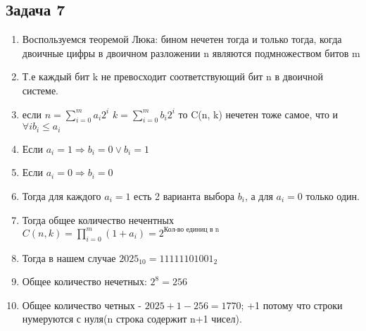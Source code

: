 \documentclass[a4paper,12pt]{article}
\begin{document}
\subsection{Задача 7}
\begin{enumerate}
    \item Воспользуемся теоремой Люка: бином нечетен тогда и только тогда, когда двоичные цифры в двоичном разложении n являются подмножеством битов m
    \item Т.е каждый бит k не превосходит соответствующий бит n в двоичной системе.
    \item если $n=\sum_{i=0}^{m}a_i2^i$ $k=\sum_{i=0}^{m}b_i2^i$ то C(n, k) нечетен тоже самое, что и $\forall i b_i \le a_i$
    \item Если $a_i=1 \Rightarrow b_i = 0 \lor b_i=1$
    \item Если $a_i=0 \Rightarrow b_i=0$
    \item Тогда для каждого $a_i=1$ есть 2 варианта выбора $b_i$, а для $a_i=0$ только один.
    \item Тогда общее количество нечентных $C(n, k)=\prod_{i=0}^{m}(1+a_i)=2^{\text{Кол-во единиц в n}}$
    \item Тогда в нашем случае $2025_{10} = 11111101001_2$
    \item Общее количество нечетных: $2^8=256$
    \item Общее количество четных - $2025+1-256=1770$; +1 потому что строки нумеруются с нуля(n строка содержит n+1 чисел).
\end{enumerate}
\end{document}
